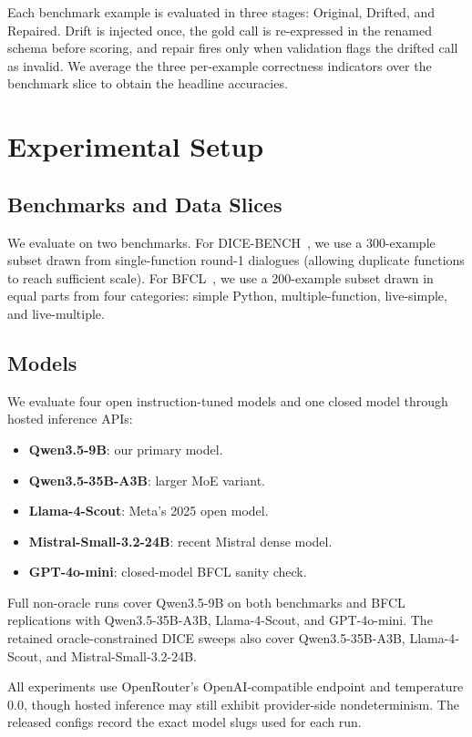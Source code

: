\documentclass{llncs}
\begin{document}
Each benchmark example is evaluated in three stages: Original, Drifted, and
Repaired. Drift is injected once, the gold call is re-expressed in the renamed
schema before scoring, and repair fires only when validation flags the drifted
call as invalid. We average the three per-example correctness indicators over
the benchmark slice to obtain the headline accuracies.

\section{Experimental Setup}
\subsection{Benchmarks and Data Slices}
We evaluate on two benchmarks. For DICE-BENCH~\cite{jang2025dicebench}, we use a
300-example subset drawn from single-function round-1 dialogues (allowing duplicate
functions to reach sufficient scale). For BFCL~\cite{bfcl2024}, we use a 200-example
subset drawn in equal parts from four categories: simple Python, multiple-function,
live-simple, and live-multiple.

\subsection{Models}
We evaluate four open instruction-tuned models and one closed model through hosted
inference APIs:

\begin{itemize}
\item \textbf{Qwen3.5-9B}: our primary model.
\item \textbf{Qwen3.5-35B-A3B}: larger MoE variant.
\item \textbf{Llama-4-Scout}: Meta's 2025 open model.
\item \textbf{Mistral-Small-3.2-24B}: recent Mistral dense model.
\item \textbf{GPT-4o-mini}: closed-model BFCL sanity check.
\end{itemize}

Full non-oracle runs cover Qwen3.5-9B on both benchmarks and BFCL replications
with Qwen3.5-35B-A3B, Llama-4-Scout, and GPT-4o-mini. The retained
oracle-constrained DICE sweeps also cover Qwen3.5-35B-A3B, Llama-4-Scout, and
Mistral-Small-3.2-24B.

All experiments use OpenRouter's OpenAI-compatible endpoint and temperature $0.0$,
though hosted inference may still exhibit provider-side nondeterminism. The
released configs record the exact model slugs used for each run.
\end{document}
